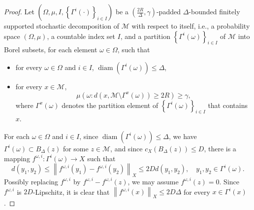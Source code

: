 \documentclass[11pt,reqno]{amsart}
\newcommand{\1}{\mathbf 1}
\begin{document}
\begin{proof}

Let $\left(\Omega,\mu,I,\left\{\Gamma^i\left(\cdot\right)\right\}_{i\in I}\right)$ be a $\left(\frac{2R}{\Delta},\gamma\right)$-padded $\Delta$-bounded finitely supported stochastic decomposition of $\mathcal{M}$ with respect to itself, i.e., a probability space $\left(\Omega,\mu\right)$, a countable index set $I$,  and a partition $\left\{\Gamma^i\left(\omega\right)\right\}_{i\in I}$ of $\mathcal{M}$ into Borel subsets, for each element $\omega\in \Omega$, such that
\begin{itemize}
    \item for every $\omega\in \Omega$ and $i\in I$, $\operatorname{diam}\left(\Gamma^i\left(\omega\right)\right)\le \Delta$,
    \item for every $x\in \mathcal{M}$,
    \begin{equation}\label{eq:padded-spec}
    \mu\left(\omega:d\left(x,\mathcal{M}\setminus\Gamma^x\left(\omega\right)\right)\ge 2R\right)\ge \gamma,
    \end{equation}
    where $\Gamma^x\left(\omega\right)$ denotes the partition element of $\left\{\Gamma^i(\omega)\right\}_{i\in I}$ that contains $x$.
\end{itemize}
For each $\omega\in \Omega$ and $i\in I$, since $\operatorname{diam}\left(\Gamma^i\left(\omega\right)\right)\le \Delta$, we have $\Gamma^i\left(\omega\right)\subset B_\Delta\left(z\right)$ for some $z\in \mathcal{M}$, and since $c_X\left(B_{\Delta}\left(z\right)\right)\le D$, there is a mapping $f^{\omega,i}:\Gamma^i\left(\omega\right)\to X$ such that
\[
d\left(y_1,y_2\right)\le \left\|f^{\omega,i}\left(y_1\right)-f^{\omega,i}\left(y_2\right)\right\|_X \le 2D d\left(y_1,y_2\right),\quad y_1,y_2\in \Gamma^i\left(\omega\right).
\]
Possibly replacing $f^{\omega,i}$ by $f^{\omega,i}-f^{\omega,i}\left(z\right)$, we may assume $f^{\omega,i}\left(z\right)=0$. Since $f^{\omega,i}$ is $2D$-Lipschitz, it is clear that $\left\|f^{\omega,i}\left(x\right)\right\|_X\le 2D\Delta$ for every $x\in \Gamma^i\left(x\right)$.



\end{proof}
\end{document}
